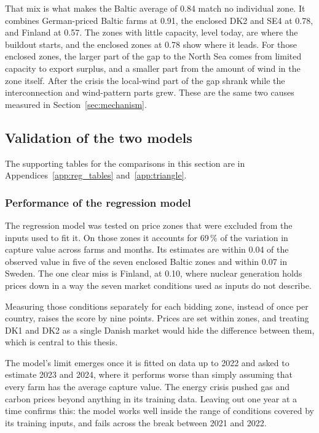 That mix is what makes the Baltic average of 0.84 match no individual zone. It combines
German-priced Baltic farms at 0.91, the enclosed DK2 and SE4 at 0.78, and
Finland at 0.57. The zones with little capacity, level today, are where the
buildout starts, and the enclosed zones at 0.78 show where it leads. For those
enclosed zones, the larger part of the gap to the North Sea comes from limited
capacity to export surplus, and a smaller part from the amount of wind in the
zone itself. After the crisis the local-wind part of the gap shrank while the
interconnection and wind-pattern parts grew\label{sec:gap_opened}. These are the
same two causes measured in Section~\ref{sec:mechanism}.

\subsection{Validation of the two models}\label{sec:trust}

The supporting tables for the comparisons in this section are in
Appendices~\ref{app:reg_tables} and~\ref{app:triangle}.

\subsubsection{Performance of the regression model}\label{sec:trust_empirical}

The regression model was tested on price zones that were excluded from the
inputs used to fit it. On those zones it accounts for 69\,\% of the variation
in capture value across farms and months. Its estimates are within 0.04 of the observed value in
five of the seven enclosed Baltic zones and within 0.07 in Sweden. The one clear
miss is Finland, at 0.10, where nuclear generation holds prices down in a way
the seven market conditions used as inputs do not describe.

Measuring those conditions separately for each bidding zone, instead of once per
country, raises the score by nine points. Prices are set within zones, and
treating DK1 and DK2 as a single Danish market would hide the difference between
them, which is central to this thesis.

The model's limit emerges once it is fitted on data up to 2022 and asked to
estimate 2023 and 2024, where it performs worse than simply assuming that every farm
has the average capture value. The energy crisis pushed gas and carbon prices
beyond anything in its training data. Leaving out one year at a time confirms
this: the model works well inside the range of conditions covered by its
training inputs, and fails across the break between 2021 and 2022.


